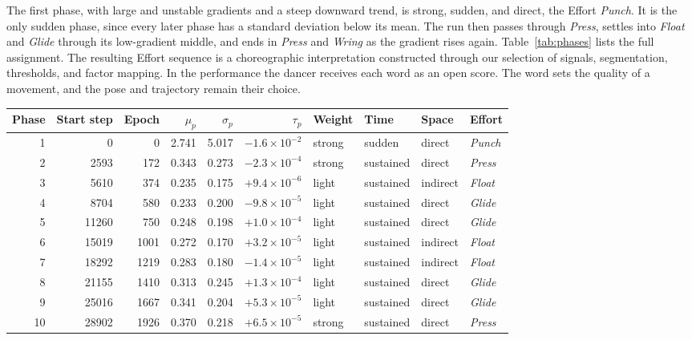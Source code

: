 The first phase, with large and unstable gradients and a steep downward trend, is strong, sudden, and direct, the Effort \textit{Punch}.
It is the only sudden phase, since every later phase has a standard deviation below its mean.
The run then passes through \textit{Press}, settles into \textit{Float} and \textit{Glide} through its low-gradient middle, and ends in \textit{Press} and \textit{Wring} as the gradient rises again.
Table~\ref{tab:phases} lists the full assignment.
The resulting Effort sequence is a choreographic interpretation constructed through our selection of signals, segmentation, thresholds, and factor mapping.
In the performance the dancer receives each word as an open score. The word sets the quality of a movement, and the pose and trajectory remain their choice.

\begin{table}[t]
  \centering
  \small
  \begin{tabular}{rrrrrrllll}
    \hline
    Phase & Start step & Epoch & $\mu_p$ & $\sigma_p$ & $\tau_p$ & Weight & Time & Space & Effort \\
    \hline
    1  & 0     & 0    & 2.741 & 5.017 & $-1.6\times10^{-2}$ & strong & sudden    & direct   & \textit{Punch} \\
    2  & 2593  & 172  & 0.343 & 0.273 & $-2.3\times10^{-4}$ & strong & sustained & direct   & \textit{Press} \\
    3  & 5610  & 374  & 0.235 & 0.175 & $+9.4\times10^{-6}$ & light  & sustained & indirect & \textit{Float} \\
    4  & 8704  & 580  & 0.233 & 0.200 & $-9.8\times10^{-5}$ & light  & sustained & direct   & \textit{Glide} \\
    5  & 11260 & 750  & 0.248 & 0.198 & $+1.0\times10^{-4}$ & light  & sustained & direct   & \textit{Glide} \\
    6  & 15019 & 1001 & 0.272 & 0.170 & $+3.2\times10^{-5}$ & light  & sustained & indirect & \textit{Float} \\
    7  & 18292 & 1219 & 0.283 & 0.180 & $-1.4\times10^{-5}$ & light  & sustained & indirect & \textit{Float} \\
    8  & 21155 & 1410 & 0.313 & 0.245 & $+1.3\times10^{-4}$ & light  & sustained & direct   & \textit{Glide} \\
    9  & 25016 & 1667 & 0.341 & 0.204 & $+5.3\times10^{-5}$ & light  & sustained & direct   & \textit{Glide} \\
    10 & 28902 & 1926 & 0.370 & 0.218 & $+6.5\times10^{-5}$ & strong & sustained & direct   & \textit{Press} \\

\end{tabular}
\end{table}
